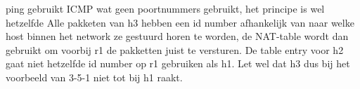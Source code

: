 ping gebruikt ICMP wat geen poortnummers gebruikt, het principe is wel hetzelfde
Alle pakketen van h3 hebben een id number afhankelijk van naar welke host binnen het network ze gestuurd horen te worden, de NAT-table wordt dan gebruikt om voorbij r1 de pakketten juist te versturen. De table entry voor h2 gaat niet hetzelfde id number op r1 gebruiken als h1. Let wel dat h3 dus bij het voorbeeld van 3-5-1 niet tot bij  h1 raakt.